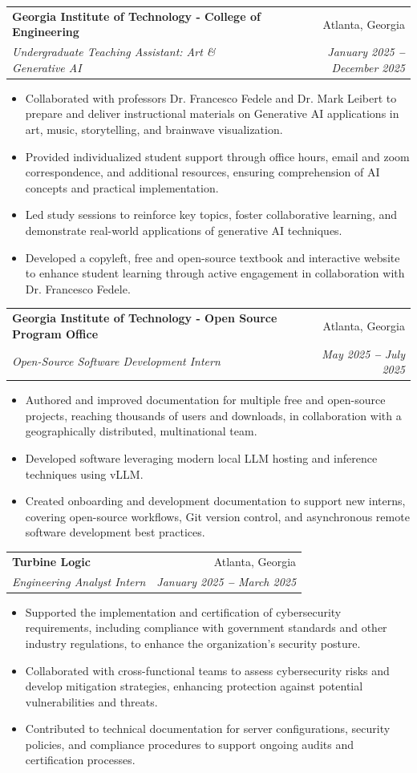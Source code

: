 \documentclass[letterpaper,11pt]{article}
\makeatletter
\newcommand{\resumeItem}[1]{
  \item\small{
    {#1 \vspace{-2pt}}
  }
}
\newcommand{\resumeSubheading}[4]{
  \vspace{-2pt}\item
    \begin{tabular*}{\textwidth}[t]{l@{\extracolsep{\fill}}r}
      \textbf{#1} & #2 \\
      \textit{\small#3} & \textit{\small #4} \\
    \end{tabular*}\vspace{-7pt}
}
\newcommand{\resumeItemListStart}{\begin{itemize}[leftmargin=0.12in]}
\newcommand{\resumeItemListEnd}{\end{itemize}\vspace{-5pt}}
\makeatother
\begin{document}
    \resumeSubheading
    {Georgia Institute of Technology - College of Engineering}{Atlanta, Georgia}
    {Undergraduate Teaching Assistant: Art \& Generative AI}{January 2025 \textbf{--} December 2025}
      \resumeItemListStart
        \resumeItem{Collaborated with professors Dr. Francesco Fedele and Dr. Mark Leibert to prepare and deliver instructional materials on Generative AI applications in art, music, storytelling, and brainwave visualization.}
        \resumeItem{Provided individualized student support through office hours, email and zoom correspondence, and additional resources, ensuring comprehension of AI concepts and practical implementation.}
        \resumeItem{Led study sessions to reinforce key topics, foster collaborative learning, and demonstrate real-world applications of generative AI techniques.}
        \resumeItem{Developed a copyleft, free and open-source textbook and interactive website to enhance student learning through active engagement in collaboration with Dr. Francesco Fedele.}
      \resumeItemListEnd

\resumeSubheading
    {Georgia Institute of Technology - Open Source Program Office}{Atlanta, Georgia}
    {Open-Source Software Development Intern}{May 2025 \textbf{--} July 2025}
    \resumeItemListStart
    \resumeItem{Authored and improved documentation for multiple free and open-source projects, reaching thousands of users and downloads, in collaboration with a geographically distributed, multinational team.}
    \resumeItem{Developed software leveraging modern local LLM hosting and inference techniques using vLLM.}
    \resumeItem{Created onboarding and development documentation to support new interns, covering open-source workflows, Git version control, and asynchronous remote software development best practices.}
\resumeItemListEnd

\resumeSubheading
    {Turbine Logic}{Atlanta, Georgia}
    {Engineering Analyst Intern}{January 2025 \textbf{--} March 2025}
    \resumeItemListStart
    \resumeItem{Supported the implementation and certification of cybersecurity requirements, including compliance with government standards and other industry regulations, to enhance the organization's security posture.}
    \resumeItem{Collaborated with cross-functional teams to assess cybersecurity risks and develop mitigation strategies, enhancing protection against potential vulnerabilities and threats.}
    \resumeItem{Contributed to technical documentation for server configurations, security policies, and compliance procedures to support ongoing audits and certification processes.}
\resumeItemListEnd
\end{document}

